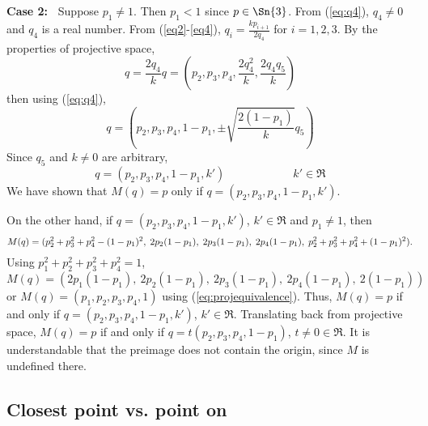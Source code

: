 \documentclass[11pt]{article}
\begin{document}
%
{\bf Case 2:\ }
Suppose $p_1 \neq 1$.
Then $p_1 < 1$ since $p \in \Sn{3}$. 
From (\ref{eq:q4}), $q_4 \neq 0$ and $q_4$ is a real number.
From (\ref{eq2}-\ref{eq4}), $q_i = \frac{kp_{i+1}}{2q_4}$ for $i=1,2,3$.
By the properties of projective space, 
\[
	q = \frac{2q_4}{k} q
	  = (p_2, p_3, p_4, \frac{2q_4^2}{k},\frac{2q_4q_5}{k})
\]
then using (\ref{eq:q4}),
\[
	q = (p_2,p_3,p_4,1-p_1, \pm \sqrt{\frac{2(1-p_1)}{k}} q_5)
\]
Since $q_5$ and $k \neq 0$ are arbitrary,
\[
	q = (p_2,p_3,p_4,1-p_1, k') \hspace{1in} k' \in \Re
\]
We have shown that $M(q) = p$ only if 
$q = (p_2,p_3,p_4,1 - p_1,k')$.

On the other hand, if $q = (p_2,p_3,p_4,1 - p_1,k')$, $k' \in \Re$
and $p_1 \neq 1$,
then 
\[
\scriptsize{M(q) = (p_2^2 + p_3^2 + p_4^2 - (1 - p_1)^2,\ 
	2p_2 (1 - p_1),\ 2p_3 (1 - p_1),\ 2p_4 (1 - p_1),\ 
	p_2^2 + p_3^2 + p_4^2 + (1 - p_1)^2).}
\]
Using $p_1^2 + p_2^2 + p_3^2 + p_4^2 = 1$,
\[
M(q) = (2p_1(1 - p_1),\ 2p_2 (1 - p_1),\ 2p_3 (1 - p_1),\ 2p_4 (1 - p_1),\ 
2(1 - p_1))
\]
or $M(q) = (p_1,p_2,p_3,p_4,1)$ using (\ref{eq:projequivalence}).
Thus, $M(q) = p$ if and only if 
$q = (p_2,p_3,p_4,1 - p_1,k')$, $k' \in \Re$.
Translating back from projective space,
$M(q) = p$ if and only if 
$q = t(p_2,p_3,p_4, 1-p_1)$, $t \neq 0 \in \Re$.
It is understandable that the preimage does not contain the origin, 
since $M$ is undefined there.
\QED

\subsection{Closest point vs. point on }
\end{document}
